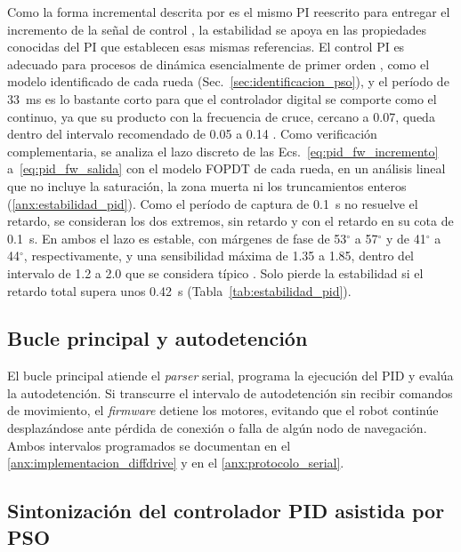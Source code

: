 Como la forma incremental descrita por \citet[Sec.~13.4]{astrom2009controlpid}
es el mismo PI reescrito para entregar el incremento de la señal de control
\citep[Sec.~8]{wittenmark_ifac_computer}, la estabilidad se apoya en las
propiedades conocidas del PI que establecen esas mismas referencias. El control
PI es adecuado para procesos de dinámica
esencialmente de primer orden \citep[Sec.~3.6]{astrom2009controlpid}, como el
modelo identificado de cada rueda (Sec.~\ref{sec:identificacion_pso}), y el
período de 33~ms es lo bastante corto para que el controlador digital se comporte
como el continuo, ya que su producto con la frecuencia de cruce, cercano a 0.07,
queda dentro del intervalo recomendado de 0.05 a 0.14
\citep[Secs.~6 y 8]{wittenmark_ifac_computer}. Como
verificación complementaria, se analiza el lazo discreto de las
Ecs.~\eqref{eq:pid_fw_incremento} a~\eqref{eq:pid_fw_salida} con el modelo FOPDT
de cada rueda, en un análisis lineal que no incluye la saturación,
la zona muerta ni los truncamientos enteros (\ref{anx:estabilidad_pid}). Como el
período de captura de 0.1~s no resuelve el retardo, se consideran los dos
extremos, sin retardo y con el retardo en su cota de 0.1~s. En ambos el lazo es
estable, con márgenes de fase de 53$^\circ$ a 57$^\circ$ y de 41$^\circ$ a
44$^\circ$, respectivamente, y una sensibilidad máxima de 1.35 a 1.85, dentro
del intervalo de 1.2 a 2.0 que se considera típico
\citep[Sec.~5]{wittenmark_ifac_computer}. Solo pierde la estabilidad si el
retardo total supera unos 0.42~s (Tabla~\ref{tab:estabilidad_pid}).

\subsection{Bucle principal y autodetención}
\label{sec:bucle_principal}

El bucle principal atiende el \textit{parser} serial, programa la ejecución del PID y evalúa la autodetención. Si transcurre el intervalo de autodetención sin recibir comandos de movimiento, el \textit{firmware} detiene los motores, evitando que el robot continúe desplazándose ante pérdida de conexión o falla de algún nodo de navegación. Ambos intervalos programados se documentan en el \ref{anx:implementacion_diffdrive} y en el \ref{anx:protocolo_serial}.

\subsection{Sintonización del controlador PID asistida por PSO}
\label{sec:sintonizacion_pso}

